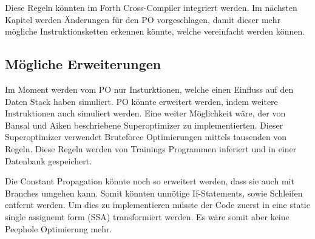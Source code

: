 Diese Regeln könnten im Forth Cross-Compiler integriert werden. Im nächsten Kapitel werden Änderungen für den PO vorgeschlagen, damit dieser mehr mögliche Instruktionsketten erkennen könnte, welche vereinfacht werden können.

\subsection{Mögliche Erweiterungen}

Im Moment werden vom PO nur Insturktionen, welche einen Einfluss auf den Daten Stack haben simuliert. PO könnte erweitert werden, indem weitere Instruktionen auch simuliert werden. Eine weiter Möglichkeit wäre, der von Bansal und Aiken beschriebene Superoptimizer zu implementierten. Dieser Superoptimizer verwendet Bruteforce Optimierungen mittels tausenden von Regeln. Diese Regeln werden von Trainings Programmen inferiert und in einer Datenbank gespeichert.\cite{superoptimizer}

Die Constant Propagation könnte noch so erweitert werden, dass sie auch mit Branches umgehen kann. Somit könnten unnötige If-Statements, sowie Schleifen entfernt werden. Um dies zu implementieren müsste der Code zuerst in eine static single assignemt form (SSA) transformiert werden.\cite{ssa} Es wäre somit aber keine Peephole Optimierung mehr.